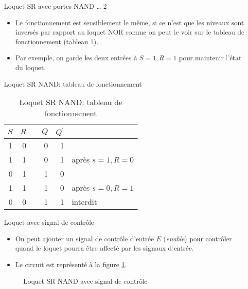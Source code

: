 \documentclass[presentation]{beamer}
\begin{document}
\begin{frame}[label={sec:org46962dd}]{Loquet SR avec portes NAND \ldots{} 2}
\begin{itemize}
\item Le fonctionnement est sensiblement le même, si ce n'est que les niveaux sont inversés par rapport au loquet NOR comme on peut le voir sur le tableau de fonctionnement (tableau \ref{tab:org2c7b0c7}).

\item Par exemple, on garde les deux entrées à \(S=1, R=1\) pour maintenir l'état du loquet.
\end{itemize}
\end{frame}

\begin{frame}[label={sec:orgcdde014}]{Loquet SR NAND: tableau de fonctionnement}
\begin{table}[htbp]
\caption{\label{tab:org2c7b0c7}Loquet SR NAND: tableau de fonctionnement}
\centering
\begin{tabular}{rrlrrl}
\(S\) & \(R\) &  & \(Q\) & \(Q^\prime\) & \\
\hline
1 & 0 &  & 0 & 1 & \\
1 & 1 &  & 0 & 1 & après \(s=1, R=0\)\\
0 & 1 &  & 1 & 0 & \\
1 & 1 &  & 1 & 0 & après \(s=0, R=1\)\\
0 & 0 &  & 1 & 1 & interdit\\
\end{tabular}
\end{table}
\end{frame}

\begin{frame}[label={sec:org7b59088}]{Loquet avec signal de contrôle}
\begin{itemize}
\item On peut ajouter un signal de contrôle d'entrée \(E\) (\emph{enable}) pour contrôler \alert{quand} le loquet pourra être affecté par les signaux d'entrée.

\item Le circuit est représenté à la figure \ref{fig:orgbe37de0}.
\end{itemize}

\begin{figure}[htbp]
\centering

\caption{\label{fig:orgbe37de0}Loquet SR NAND avec signal de contrôle}
\end{figure}
\end{frame}
\end{document}
